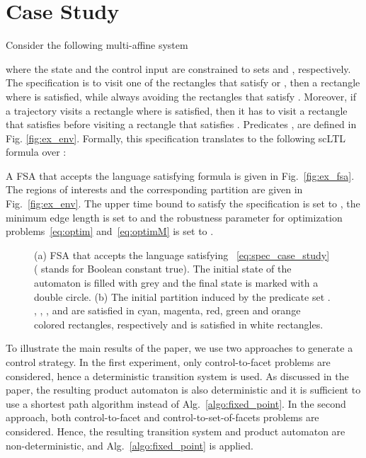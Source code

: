 \documentclass{ifacconf}
\begin{document}
\section{Case Study}\label{sec:casestudy}

Consider the following multi-affine system

where the state  and the control input  are constrained to sets 
 and , respectively.
The specification is to visit one of the rectangles that satisfy  or , then a rectangle where  is satisfied, while always avoiding the rectangles that satisfy . Moreover, if a trajectory visits a rectangle where  is satisfied, then it has to visit a rectangle that satisfies  before visiting a rectangle that satisfies . Predicates ,  are defined in Fig. \ref{fig:ex_env}. Formally, this specification translates to the following scLTL formula  over : 


A FSA  that accepts the language satisfying formula  is given in Fig.~\ref{fig:ex_fsa}. The regions of interests and the corresponding partition are given in Fig.~\ref{fig:ex_env}. The upper time bound to satisfy the specification is set to , the minimum edge length is set to  and the robustness parameter for optimization problems~\eqref{eq:optim} and~\eqref{eq:optimM} is set to .

\begin{figure}
\centering
{}
\caption{(a) FSA  that accepts the language satisfying ~\eqref{eq:spec_case_study} ( stands for Boolean constant true). The initial state of the automaton is filled with grey and the final state is marked with a double circle. (b) The initial partition induced by the predicate set . , , ,  and  are satisfied in cyan, magenta, red, green and orange colored rectangles, respectively and  is satisfied in white rectangles.}
\end{figure} 

To illustrate the main results of the paper, we use two approaches to generate a control strategy. In the first experiment, only control-to-facet problems are considered, hence a deterministic transition system is used.
As discussed in the paper, the resulting product automaton is also deterministic and it is sufficient to use a shortest path algorithm instead of Alg.~\ref{algo:fixed_point}. 
In the second approach, both control-to-facet and control-to-set-of-facets problems are considered. Hence, the resulting transition system and product automaton are non-deterministic, and Alg.~\ref{algo:fixed_point} is applied.
\end{document}
